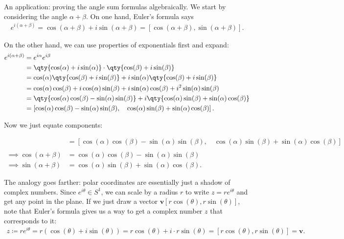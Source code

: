 \begin{example}[?]

An application: proving the angle sum formulas algebraically. We start
by considering the angle \(\alpha + \beta\). On one hand, Euler's
formula says
\begin{align*}
e^{i( \alpha + \beta) } = \cos(\alpha + \beta) + i\sin(\alpha + \beta) 
= [\cos(\alpha + \beta), \sin(\alpha + \beta)]
.\end{align*}

On the other hand, we can use properties of exponentials first and
expand:
\begin{align*}
e^{i(\alpha + \beta)} 
&= e^{i\alpha} e^{i\beta} \\
&= \qty{ \cos(\alpha) + i\sin(\alpha)} \cdot \qty{ \cos(\beta) + i\sin(\beta) } \\
&= 
\cos(\alpha) 
\qty{ \cos(\beta) + i\sin(\beta) } 
+
i\sin(\alpha) 
\qty{ \cos(\beta) + i\sin(\beta) } 
\\
&=
\cos(\alpha)\cos(\beta) + i \cos(\alpha)\sin(\beta)
+
i\sin(\alpha)\cos(\beta) + i^2 \sin(\alpha)\sin(\beta)
\\
&= \qty{ \cos(\alpha)\cos( \beta) - \sin(\alpha)\sin(\beta) }
+
i
\qty{\cos(\alpha) \sin(\beta) + \sin(\alpha)\cos(\beta) } \\
&=
\left[ \cos(\alpha)\cos( \beta) - \sin(\alpha)\sin(\beta),\quad 
\cos(\alpha) \sin(\beta) + \sin(\alpha)\cos(\beta)
\right]
.\end{align*}

Now we just equate components:

\begin{align*}
[\cos(\alpha + \beta), \sin(\alpha + \beta)]
&= \left[ \cos(\alpha)\cos( \beta) - \sin(\alpha)\sin(\beta),\quad 
\cos(\alpha) \sin(\beta) + \sin(\alpha)\cos(\beta)
\right] \\ \\
\implies \cos(\alpha + \beta) &= \cos(\alpha)\cos(\beta) - \sin(\alpha)\sin(\beta) \\
\implies \sin(\alpha + \beta) &= \cos(\alpha)\sin(\beta) + \sin(\alpha)\cos(\beta) 
.\end{align*}

\end{example}

\begin{remark}

The analogy goes farther: polar coordinates are essentially just a
shadow of complex numbers. Since \(e^{i\theta} \in S^1\), we can scale
by a radius \(r\) to write \(z = re^{i\theta}\) and get any point in the
plane. If we just draw a vector
\(\mathbf{v}[r\cos(\theta), r\sin(\theta)]\), note that Euler's formula
gives us a way to get a complex number \(z\) that corresponds to it:
\begin{align*}
z \coloneqq re^{i\theta} = r(\cos(\theta) + i\sin(\theta)) = r\cos(\theta) + i\cdot r\sin(\theta) = [r\cos(\theta), r\sin(\theta)] = \mathbf{v}
.\end{align*}

\end{remark}

